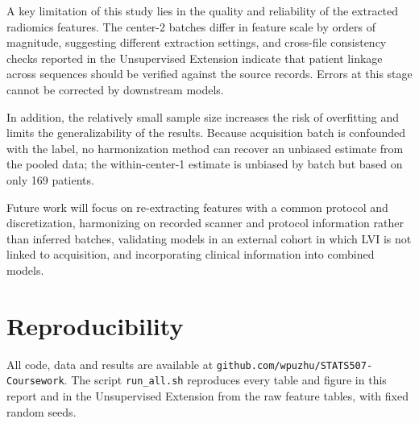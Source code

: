 \documentclass[conference]{IEEEtran}
\begin{document}
A key limitation of this study lies in the quality and reliability of the extracted radiomics features. The center-2 batches differ in feature scale by orders of magnitude, suggesting different extraction settings, and cross-file consistency checks reported in the Unsupervised Extension indicate that patient linkage across sequences should be verified against the source records. Errors at this stage cannot be corrected by downstream models.

In addition, the relatively small sample size increases the risk of overfitting and limits the generalizability of the results. Because acquisition batch is confounded with the label, no harmonization method can recover an unbiased estimate from the pooled data; the within-center-1 estimate is unbiased by batch but based on only 169 patients.

Future work will focus on re-extracting features with a common protocol and discretization, harmonizing on recorded scanner and protocol information rather than inferred batches, validating models in an external cohort in which LVI is not linked to acquisition, and incorporating clinical information into combined models.

\section{Reproducibility}
\label{sec:repro}
All code, data and results are available at \texttt{github.com/wpuzhu/STATS507-Coursework}. The script \texttt{run\_all.sh} reproduces every table and figure in this report and in the Unsupervised Extension from the raw feature tables, with fixed random seeds.



\end{document}

